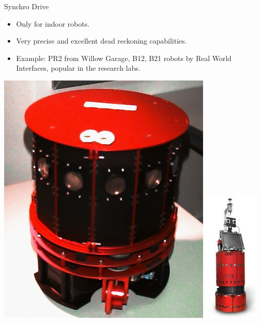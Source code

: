 \documentclass[compress]{beamer}
\begin{document}
\begin{frame}{Synchro Drive}

\begin{itemize}
    \item Only for indoor robots.
    \item Very precise and excellent dead reckoning capabilities.
    \item Example: PR2 from Willow Garage, B12, B21 robots by Real World
  Interfaces, popular in the research labs.
\end{itemize}

    \begin{center}
        \includegraphics[width=0.4\linewidth]{synchrodrive_ex1}
        \includegraphics[width=0.4\linewidth]{synchrodrive_ex2}
    \end{center}

\end{frame}
\end{document}
